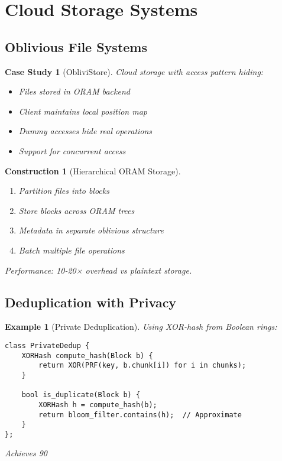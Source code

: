 \documentclass[11pt,final]{article}
\newtheorem{example}[theorem]{Example}
\newtheorem{construction}[theorem]{Construction}
\newtheorem{casestudy}[theorem]{Case Study}
\begin{document}
\section{Cloud Storage Systems}

\subsection{Oblivious File Systems}

\begin{casestudy}[ObliviStore]
Cloud storage with access pattern hiding:
\begin{itemize}
    \item Files stored in ORAM backend
    \item Client maintains local position map
    \item Dummy accesses hide real operations
    \item Support for concurrent access
\end{itemize}
\end{casestudy}

\begin{construction}[Hierarchical ORAM Storage]
\begin{enumerate}
    \item Partition files into blocks
    \item Store blocks across ORAM trees
    \item Metadata in separate oblivious structure
    \item Batch multiple file operations
\end{enumerate}
Performance: 10-20× overhead vs plaintext storage.
\end{construction}

\subsection{Deduplication with Privacy}

\begin{example}[Private Deduplication]
Using XOR-hash from Boolean rings:
\begin{verbatim}
class PrivateDedup {
    XORHash compute_hash(Block b) {
        return XOR(PRF(key, b.chunk[i]) for i in chunks);
    }
    
    bool is_duplicate(Block b) {
        XORHash h = compute_hash(b);
        return bloom_filter.contains(h);  // Approximate
    }
};
\end{verbatim}
Achieves 90%
\end{example}
\end{document}

